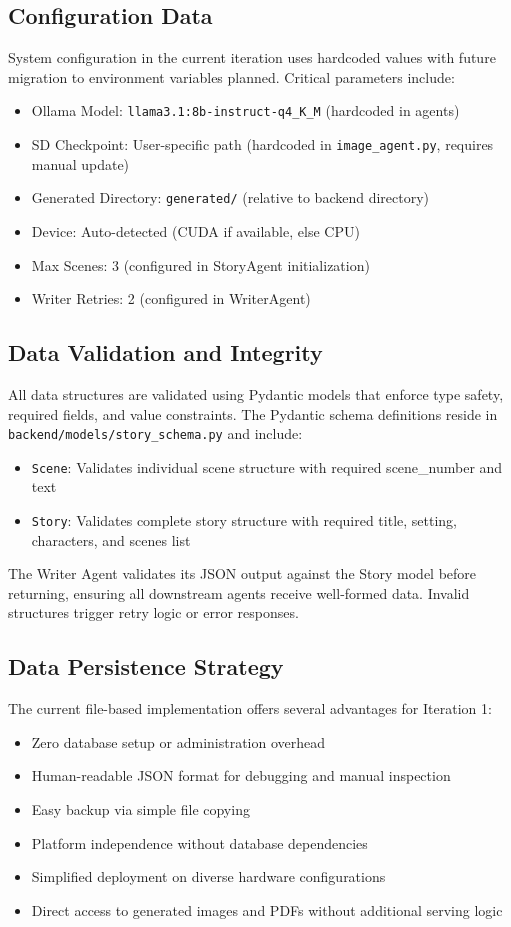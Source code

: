 \subsection{Configuration Data}
System configuration in the current iteration uses hardcoded values with future migration to environment variables planned. Critical parameters include:
\begin{itemize}
    \item Ollama Model: \texttt{llama3.1:8b-instruct-q4\_K\_M} (hardcoded in agents)
    \item SD Checkpoint: User-specific path (hardcoded in \texttt{image\_agent.py}, requires manual update)
    \item Generated Directory: \texttt{generated/} (relative to backend directory)
    \item Device: Auto-detected (CUDA if available, else CPU)
    \item Max Scenes: 3 (configured in StoryAgent initialization)
    \item Writer Retries: 2 (configured in WriterAgent)
\end{itemize}

\subsection{Data Validation and Integrity}
All data structures are validated using Pydantic \cite{pydantic2024} models that enforce type safety, required fields, and value constraints. The Pydantic schema definitions reside in \texttt{backend/models/story\_schema.py} and include:
\begin{itemize}
    \item \texttt{Scene}: Validates individual scene structure with required scene\_number and text
    \item \texttt{Story}: Validates complete story structure with required title, setting, characters, and scenes list
\end{itemize}

The Writer Agent validates its JSON output against the Story model before returning, ensuring all downstream agents receive well-formed data. Invalid structures trigger retry logic or error responses.

\subsection{Data Persistence Strategy}
The current file-based implementation offers several advantages for Iteration 1:
\begin{itemize}
    \item Zero database setup or administration overhead
    \item Human-readable JSON format for debugging and manual inspection
    \item Easy backup via simple file copying
    \item Platform independence without database dependencies
    \item Simplified deployment on diverse hardware configurations
    \item Direct access to generated images and PDFs without additional serving logic
\end{itemize}

